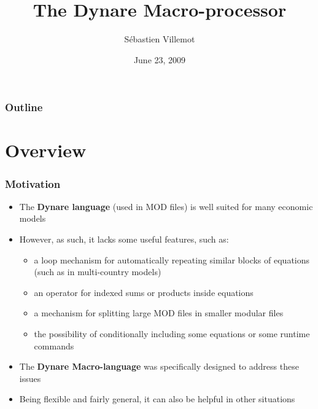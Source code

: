\documentclass{beamer}
\title{The Dynare Macro-processor}
\author{Sébastien Villemot}
\institute[BdF - CEPREMAP]{Banque de France - CEPREMAP}
\date{June 23, 2009}
\begin{document}
\begin{frame}
  \titlepage
\end{frame}


\begin{frame}
  \frametitle{Outline}
  \tableofcontents
\end{frame}

\section{Overview}

\begin{frame}
  \frametitle{Motivation}
  \begin{itemize}
  \item The \textbf{Dynare language} (used in MOD files) is well suited for many economic models
  \item However, as such, it lacks some useful features, such as:
    \begin{itemize}
    \item a loop mechanism for automatically repeating similar blocks of equations (such as in multi-country models)
    \item an operator for indexed sums or products inside equations
    \item a mechanism for splitting large MOD files in smaller modular files
    \item the possibility of conditionally including some equations or some runtime commands
  \end{itemize}
  \item The \textbf{Dynare Macro-language} was specifically designed to address these issues
  \item Being flexible and fairly general, it can also be helpful in other situations
  \end{itemize}
\end{frame}
\end{document}
